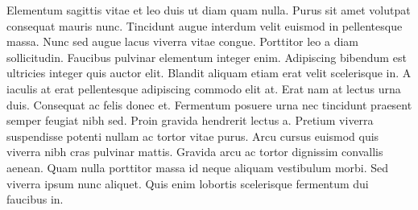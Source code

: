 Elementum sagittis vitae et leo duis ut diam quam nulla. Purus sit amet volutpat consequat mauris nunc. Tincidunt augue interdum velit euismod in pellentesque massa. Nunc sed augue lacus viverra vitae congue. Porttitor leo a diam sollicitudin. Faucibus pulvinar elementum integer enim. Adipiscing bibendum est ultricies integer quis auctor elit. Blandit aliquam etiam erat velit scelerisque in. A iaculis at erat pellentesque adipiscing commodo elit at. Erat nam at lectus urna duis. Consequat ac felis donec et. Fermentum posuere urna nec tincidunt praesent semper feugiat nibh sed. Proin gravida hendrerit lectus a. Pretium viverra suspendisse potenti nullam ac tortor vitae purus. Arcu cursus euismod quis viverra nibh cras pulvinar mattis. Gravida arcu ac tortor dignissim convallis aenean. Quam nulla porttitor massa id neque aliquam vestibulum morbi. Sed viverra ipsum nunc aliquet. Quis enim lobortis scelerisque fermentum dui faucibus in.